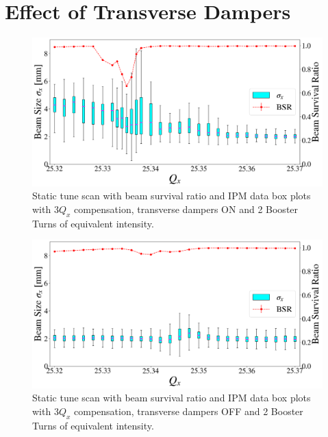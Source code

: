 \section{Effect of Transverse Dampers}

\begin{figure}[H]
    \centering
    \includegraphics[width=\columnwidth]{chapter6/static2turns_ipm_dampersON.png}
    \caption{Static tune scan with beam survival ratio and IPM data box plots with $3Q_x$ compensation, transverse dampers ON and 2 Booster Turns of equivalent intensity.}
    \label{fig:static2_dampersON}
\end{figure}

\begin{figure}[H]
    \centering
    \includegraphics[width=\columnwidth]{chapter6/static2turns_ipm_dampersOFF.png}
    \caption{Static tune scan with beam survival ratio and IPM data box plots with $3Q_x$ compensation, transverse dampers OFF and 2 Booster Turns of equivalent intensity.}
    \label{fig:static2_dampersOFF}
\end{figure}

